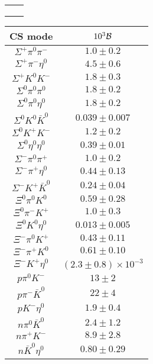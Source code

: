 \begin{table}
{\begin{tabular}{|c|c|}
		&\\
		&\\
		&\\
		\hline
	\end{tabular}
	\begin{tabular}{|c|c|}
		\hline
		CS mode& $10^{3}{\cal B}$\\
		\hline
		$\Sigma^{+} \pi^{0} \pi^{-} $ & $    1.0 \pm     0.2 $ \\
		$\Sigma^{+} \pi^{-} \eta^{0} $ & $    4.5 \pm     0.6 $ \\
		$\Sigma^{+} K^{0} K^{-} $ & $    1.8 \pm     0.3 $ \\
		$\Sigma^{0} \pi^{0} \pi^{0} $ & $    1.8 \pm     0.2 $ \\
		$\Sigma^{0} \pi^{0} \eta^{0} $ & $    1.8 \pm     0.2 $ \\
		$\Sigma^{0} K^{0} \bar{K}^{0} $ & $     0.039 \pm     0.007 $ \\
		$\Sigma^{0} K^{+} K^{-} $ & $    1.2 \pm     0.2 $ \\
		$\Sigma^{0} \eta^{0} \eta^{0} $ & $     0.39 \pm     0.01 $ \\
		$\Sigma^{-} \pi^{0} \pi^{+} $ & $     1.0 \pm     0.2 $ \\
		$\Sigma^{-} \pi^{+} \eta^{0} $ & $     0.44 \pm     0.13 $ \\
		$\Sigma^{-} K^{+} \bar{K}^{0} $ & $     0.24 \pm     0.04 $ \\
		$\Xi^{0} \pi^{0} K^{0} $ & $     0.59 \pm     0.28 $ \\
		$\Xi^{0} \pi^{-} K^{+} $ & $    1.0 \pm     0.3 $ \\
		$\Xi^{0} K^{0} \eta^{0} $ & $     0.013 \pm     0.005 $ \\
		$\Xi^{-} \pi^{0} K^{+} $ & $     0.43 \pm     0.11 $ \\
		$\Xi^{-} \pi^{+} K^{0} $ & $     0.61 \pm     0.10 $ \\
		$\Xi^{-} K^{+} \eta^{0} $ & $     (2.3 \pm     0.8)\times10^{-3}$ \\
		$p \pi^{0} K^{-} $ & $   13 \pm    2 $ \\
		$p \pi^{-} \bar{K}^{0} $ & $   22 \pm    4 $ \\
		$p K^{-} \eta^{0} $ & $    1.9 \pm     0.4 $ \\
		$n \pi^{0} \bar{K}^{0} $ & $    2.4 \pm    1.2 $ \\
		$n \pi^{+} K^{-} $ & $    8.9 \pm    2.8 $ \\
		$n \bar{K}^{0} \eta^{0} $ & $     0.80 \pm     0.29 $ \\

\end{tabular}}
\end{table}

